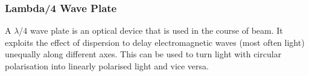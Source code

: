 \subsubsection{Lambda/4 Wave Plate}
\label{toc:Lambda4}
A $\lambda$/4 wave plate is an optical device that is used in the course of beam. 
It exploits the effect of dispersion to delay electromagnetic waves (most often light) unequally along different axes. 
This can be used to turn light with circular polarisation into linearly polarised light and vice versa.

